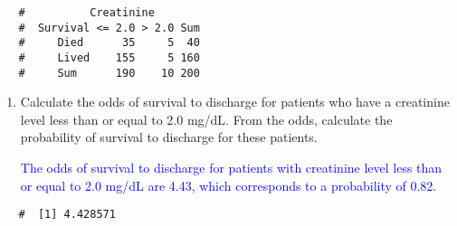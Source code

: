 \documentclass[letterpaper,12pt,twoside,]{pinp}
\begin{document}
\begin{enumerate}
\begin{Shaded}
\begin{Highlighting}[]
\NormalTok{(}\SpecialCharTok{$}\SpecialCharTok{$}
        \NormalTok{(}\NormalTok{, }\NormalTok{)))}
\end{Highlighting}
\end{Shaded}

  \begin{ShadedResult}
   \begin{verbatim}
   #          Creatinine
   #  Survival <= 2.0 > 2.0 Sum
   #     Died      35     5  40
   #     Lived    155     5 160
   #     Sum      190    10 200
   \end{verbatim}
   \end{ShadedResult}

  \begin{enumerate}
  \def\labelenumii{\alph{enumii})}
  \item
    Calculate the odds of survival to discharge for patients who have a
    creatinine level less than or equal to 2.0 mg/dL. From the odds,
    calculate the probability of survival to discharge for these
    patients.

    \textcolor{blue}{The odds of survival to discharge for patients with creatinine level less than or equal to 2.0 mg/dL are 4.43, which corresponds to a probability of 0.82.}
  \end{enumerate}

\begin{Shaded}
\begin{Highlighting}[]
\OtherTok{=} \SpecialCharTok{/}
\end{Highlighting}
\end{Shaded}

  \begin{ShadedResult}
   \begin{verbatim}
   #  [1] 4.428571
   \end{verbatim}
   \end{ShadedResult}

\begin{Shaded}
\begin{Highlighting}[]
\OtherTok{=}\SpecialCharTok{/}\NormalTok{(} \SpecialCharTok{+}
\end{Highlighting}
\end{Shaded}


\end{enumerate}
\end{document}
